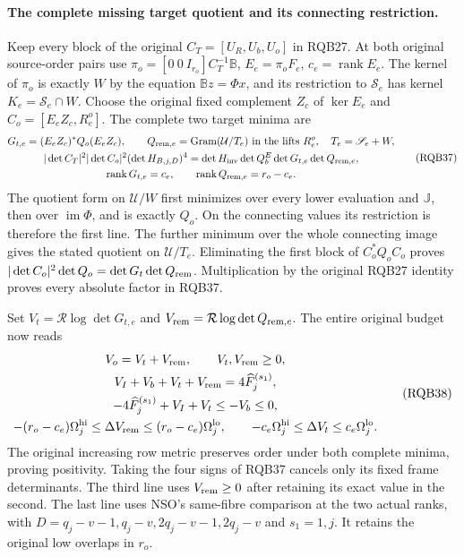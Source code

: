 \documentclass[11pt,a4paper]{article}
\begin{document}
\paragraph{The complete missing target quotient and its connecting restriction.}
Keep every block of the original $C_T=[U_R,U_b,U_o]$ in RQB27.
At both original source-order pairs use
$\pi_o=[0\ 0\ I_{r_o}]C_T^{-1}\mathbb B$,
$E_e=\pi_oF_e$, $c_e=\operatorname{rank}E_e$.
The kernel of $\pi_o$ is exactly $W$ by the equation
$\mathbb Bz=\Phi x$, and its restriction to $\mathscr S_e$
has kernel $K_e=\mathscr S_e\cap W$.
Choose the original fixed complement $Z_c$ of $\ker E_e$
and $C_o=[E_eZ_c,R_e^o]$. The complete two target minima are
\[
 \begin{gathered}
 G_{t,e}=(E_eZ_c)^*Q_o(E_eZ_c),\qquad
 Q_{{\rm rem},e}=\operatorname{Gram}(\mathcal U/T_e)
       \ \hbox{in the lifts }R_e^o,\quad T_e=\mathscr S_e+W,\\
 |\det C_T|^2|\det C_o|^2(\det H_{B,j,D})^4
       =\det H_{\rm inv}\det Q_b^E
                         \det G_{t,e}\det Q_{{\rm rem},e},\\
 \operatorname{rank}G_{t,e}=c_e,\qquad
 \operatorname{rank}Q_{{\rm rem},e}=r_o-c_e .
 \end{gathered}\tag{RQB37}
\]
The quotient form on $\mathcal U/W$ first minimizes over every
lower evaluation and $\mathbb J$, then over $\operatorname{im}\Phi$,
and is exactly $Q_o$. On the connecting values its restriction
is therefore the first line. The further minimum over the whole
connecting image gives the stated quotient on $\mathcal U/T_e$.
Eliminating the first block of $C_o^*Q_oC_o$ proves
$|\det C_o|^2\det Q_o=\det G_t\det Q_{\rm rem}$.
Multiplication by the original RQB27 identity proves every
absolute factor in RQB37.

Set $V_t=\mathcal R\log\det G_{t,e}$ and
$V_{\rm rem}=\mathcal R\log\det Q_{{\rm rem},e}$.
The entire original budget now reads
\[
 \begin{gathered}
 V_o=V_t+V_{\rm rem},\qquad V_t,V_{\rm rem}\ge0,\\
 V_I+V_b+V_t+V_{\rm rem}=4\widehat F_j^{(s_1)},\\
 -4\widehat F_j^{(s_1)}+V_I+V_t
                   \le -V_b\le0,\\
 -(r_o-c_e)\Omega_j^{\rm hi}\le\Delta V_{\rm rem}
                   \le(r_o-c_e)\Omega_j^{\rm lo},\qquad
 -c_e\Omega_j^{\rm hi}\le\Delta V_t\le c_e\Omega_j^{\rm lo}.
 \end{gathered}\tag{RQB38}
\]
The original increasing row metric preserves order under both
complete minima, proving positivity. Taking the four signs of
RQB37 cancels only its fixed frame determinants. The third line
uses $V_{\rm rem}\ge0$ after retaining its exact value in the
second. The last line uses NSO's same-fibre comparison at the
two actual ranks, with $D=q_j-v-1,q_j-v,2q_j-v-1,2q_j-v$ and
$s_1=1,j$. It retains the original low overlaps in $r_o$.
\end{document}
